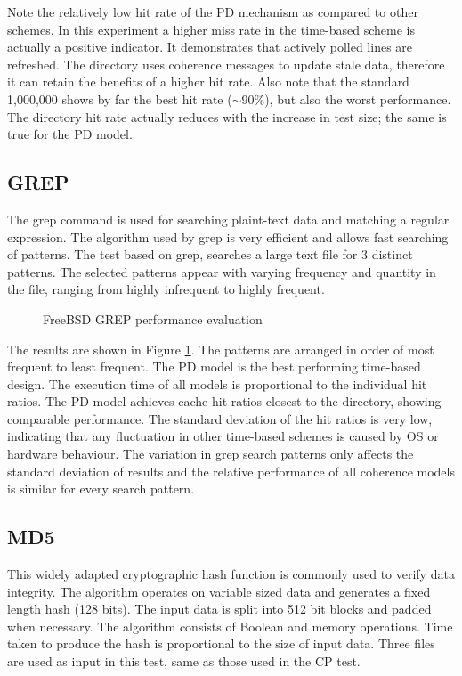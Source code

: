		Note the relatively low hit rate of the PD mechanism as compared to other schemes. In this experiment a higher miss rate in the time-based scheme is actually a positive indicator. It demonstrates that actively polled lines are refreshed. The directory uses coherence messages to update stale data, therefore it can retain the benefits of a higher hit rate. Also note that the standard 1,000,000 shows by far the best hit rate ($\sim$90\%), but also the worst performance. The directory hit rate actually reduces with the increase in test size; the same is true for the PD model.
		
		
	\subsection{GREP}
		\label{results_grep}
		The grep command is used for searching plaint-text data and matching a regular expression. The algorithm used by grep is very efficient and allows fast searching of patterns. The test based on grep, searches a large text file for 3 distinct patterns. The selected patterns appear with varying frequency and quantity in the file, ranging from highly infrequent to highly frequent.

		\begin{figure}[!ht]
		\centering 
			\caption{FreeBSD GREP performance evaluation} 
			\label{grep_freebsd_full}
		\end{figure}

		The results are shown in Figure \ref{grep_freebsd_full}. The patterns are arranged in order of most frequent to least frequent. The PD model is the best performing time-based design. The execution time of all models is proportional to the individual hit ratios. The PD model achieves cache hit ratios closest to the directory, showing comparable performance. The standard deviation of the hit ratios is very low, indicating that any fluctuation in other time-based schemes is caused by OS or hardware behaviour. The variation in grep search patterns only affects the standard deviation of results and the relative performance of all coherence models is similar for every search pattern.
		

	\subsection{MD5}
		\label{results_md5}
		This widely adapted cryptographic hash function is commonly used to verify data integrity. The algorithm operates on variable sized data and generates a fixed length hash (128 bits). The input data is split into 512 bit blocks and padded when necessary. The algorithm consists of Boolean and memory operations. Time taken to produce the hash is proportional to the size of input data. Three files are used as input in this test, same as those used in the CP test.
		
